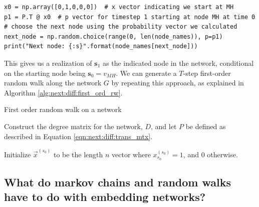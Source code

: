 \begin{lstlisting}[style=python]
x0 = np.array([0,1,0,0,0])  # x vector indicating we start at MH
p1 = P.T @ x0  # p vector for timestep 1 starting at node MH at time 0
# choose the next node using the probability vector we calculated
next_node = np.random.choice(range(0, len(node_names)), p=p1)
print("Next node: {:s}".format(node_names[next_node]))
\end{lstlisting}


This gives us a realization of $\mathbf s_1$ as the indicated node in the network, conditional on the starting node being $\mathbf s_0 = v_{MH}$. We can generate a $T$-step first-order random walk along the network $G$ by repeating this approach, as explained in Algorithm \ref{alg:next:diff:first_ord_rw}.

\begin{algorithm}
\label{alg:next:diff:first_ord_rw}
\caption{First order random walk on a network}
\SetAlgoLined

Construct the degree matrix for the network, $D$, and let $P$ be defined as described in Equation \eqref{eqn:next:diff:trans_mtx}.


Initialize $\vec x^{(s_0)}$ to be the length $n$ vector where $x_{s_0}^{(s_{0})} = 1$, and $0$ otherwise.


\end{algorithm}


\subsection{What do markov chains and random walks have to do with embedding networks?}

